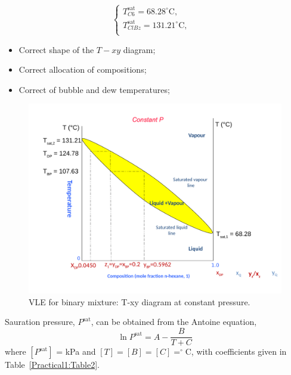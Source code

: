 \documentclass[calculator,allquestions,datasheet,solutions]{exam_newMarcus2}
\newcommand{\frc}{\displaystyle\frac}
\begin{document}
\begin{question}
\begin{enumerate}[a)]
{\begin{displaymath}
                                    \begin{cases}
                                      T^{\text{sat}}_{C6}= 68.28^{\circ}\text{C}, &\\
                                      T^{\text{sat}}_{ClBz}= 131.21^{\circ}\text{C}, &\\                                      
                                    \end{cases}
                                  \end{displaymath}
                                  \begin{itemize}
                                     \item Correct shape of the $T-xy$ diagram;~
                                     \item Correct allocation of compositions;~
                                     \item Correct of bubble and dew temperatures;~
                                  \end{itemize}

      \begin{figure}[h]
        \begin{center}
          \includegraphics[width=.8\linewidth,clip]{./Pics/VLE_Txy_Diagram}
          \caption{VLE for binary mixture: T-xy diagram at constant pressure.}\label{Figure:Fig1}
        \end{center}
        \end{figure} 
                  }
         \end{enumerate}

         Sauration pressure, $P^{\text{sat}}$, can be obtained from the Antoine equation,
          \begin{displaymath}
            \ln{P^{\text{sat}}} = A - \frc{B}{T+C}
          \end{displaymath}
          where $\left[P^{\text{sat}}\right]$ = kPa and $[T]=[B]=[C] = ^{\circ}$C, with coefficients given in Table~\ref{Practical1:Table2}.
           


\end{question}
\end{document}
